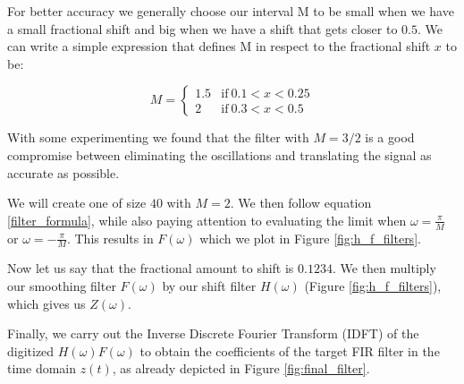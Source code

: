 \documentclass[]{usiinfbachelorproject}
\begin{document}
		
		For better accuracy we generally choose our interval M to be small when we have a small fractional shift and big when we have a shift that gets closer to $0.5$. We can write a simple expression that defines M in respect to the fractional shift $x$ to be:
		
		
		\begin{equation*}
			M = 
			\begin{cases}
				1.5 & \text{if}~ 0.1 < x < 0.25\\
				2 & \text{if}~ 0.3 < x < 0.5
			\end{cases}
		\end{equation*}
		
		With some experimenting we found that the filter with $M=3/2$ is a good compromise between eliminating the oscillations and translating the signal as accurate as possible.
		
		We will create one of size $40$ with $M=2$. We then follow equation \eqref{filter_formula}, while also paying attention to evaluating the limit when $\omega=\frac{\pi}{M}$ or $\omega=-\frac{\pi}{M}$. This results in $F(\omega)$ which we plot in Figure \ref{fig:h_f_filters}.
		
		Now let us say that the fractional amount to shift is $0.1234$. We then multiply our smoothing filter $F(\omega)$ by our shift filter $H(\omega)$ (Figure \ref{fig:h_f_filters}), which gives us $Z(\omega)$.
		
		Finally, we carry out the Inverse Discrete Fourier Transform (IDFT) of the digitized $H(\omega)F(\omega)$ to obtain the coefficients of the target FIR filter in the time domain $z(t)$, as already depicted in Figure \ref{fig:final_filter}.
		
\end{document}
